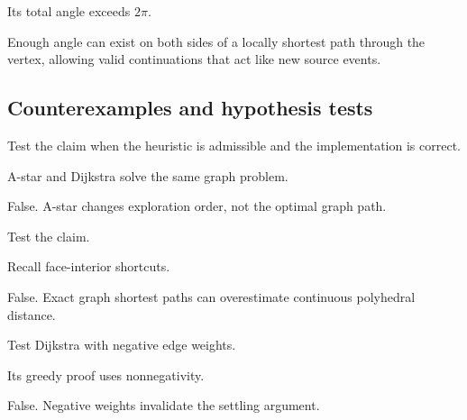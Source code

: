 \begin{hint}
Its total angle exceeds \(2\pi\).
\end{hint}

\begin{solution}
Enough angle can exist on both sides of a locally shortest path through the vertex, allowing valid continuations that act like new source events.
\end{solution}

\subsection*{Counterexamples and hypothesis tests}

\begin{exercise}\label{exr:vii39-ped-10}
Test the claim when the heuristic is admissible and the implementation is correct.
\end{exercise}

\begin{hint}
A-star and Dijkstra solve the same graph problem.
\end{hint}

\begin{solution}
False.  A-star changes exploration order, not the optimal graph path.
\end{solution}

\begin{exercise}\label{exr:vii39-ped-11}
Test the claim.
\end{exercise}

\begin{hint}
Recall face-interior shortcuts.
\end{hint}

\begin{solution}
False.  Exact graph shortest paths can overestimate continuous polyhedral distance.
\end{solution}

\begin{exercise}\label{exr:vii39-ped-12}
Test Dijkstra with negative edge weights.
\end{exercise}

\begin{hint}
Its greedy proof uses nonnegativity.
\end{hint}

\begin{solution}
False.  Negative weights invalidate the settling argument.
\end{solution}

